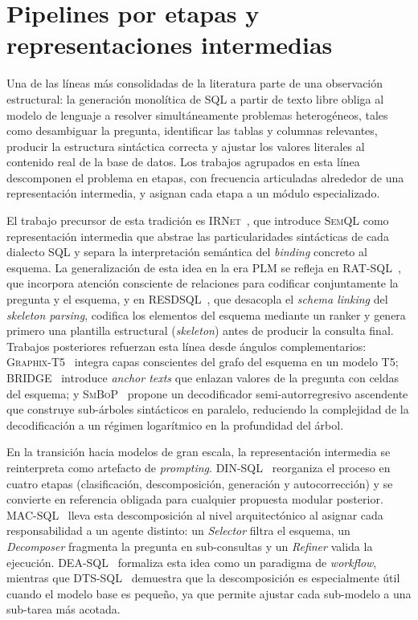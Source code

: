 \section{Pipelines por etapas y representaciones intermedias}
\label{sec:sota-pipelines}

Una de las líneas más consolidadas de la literatura parte de una observación
estructural: la generación monolítica de \ac{SQL} a partir de texto libre
obliga al modelo de lenguaje a resolver simultáneamente problemas heterogéneos,
tales como desambiguar la pregunta, identificar las tablas y columnas
relevantes, producir la estructura sintáctica correcta y ajustar los valores
literales al contenido real de la base de datos. Los trabajos agrupados en
esta línea descomponen el problema en etapas, con frecuencia articuladas
alrededor de una representación intermedia, y asignan cada etapa a un módulo
especializado.

El trabajo precursor de esta tradición es \textsc{IRNet}~\cite{IRNet}, que
introduce \textsc{SemQL} como representación intermedia que abstrae las
particularidades sintácticas de cada dialecto \ac{SQL} y separa la
interpretación semántica del \emph{binding} concreto al esquema. La
generalización de esta idea en la era \ac{PLM} se refleja en
\textsc{RAT-SQL}~\cite{RAT-SQL2021}, que incorpora atención consciente de
relaciones para codificar conjuntamente la pregunta y el esquema, y en
\textsc{RESDSQL}~\cite{RESDSQL2023}, que desacopla el \emph{schema linking}
del \emph{skeleton parsing}, codifica los elementos del esquema mediante un
ranker y genera primero una plantilla estructural (\emph{skeleton}) antes de
producir la consulta final. Trabajos posteriores refuerzan esta línea desde
ángulos complementarios: \textsc{Graphix-T5}~\cite{Graphix-T52022} integra
capas conscientes del grafo del esquema en un modelo \textsc{T5};
\textsc{BRIDGE}~\cite{BRIDGE2020} introduce \emph{anchor texts} que enlazan
valores de la pregunta con celdas del esquema; y
\textsc{SmBoP}~\cite{SmBoP2021} propone un decodificador semi-autorregresivo
ascendente que construye sub-árboles sintácticos en paralelo, reduciendo la
complejidad de la decodificación a un régimen logarítmico en la profundidad
del árbol.

En la transición hacia modelos de gran escala, la representación intermedia
se reinterpreta como artefacto de \emph{prompting}. \textsc{DIN-SQL}~%
\cite{DIN-SQL2023} reorganiza el proceso en cuatro etapas (clasificación,
descomposición, generación y autocorrección) y se convierte en referencia
obligada para cualquier propuesta modular posterior. \textsc{MAC-SQL}~%
\cite{MAC-SQL2023} lleva esta descomposición al nivel arquitectónico al
asignar cada responsabilidad a un agente distinto: un \emph{Selector} filtra
el esquema, un \emph{Decomposer} fragmenta la pregunta en sub-consultas y un
\emph{Refiner} valida la ejecución. \textsc{DEA-SQL}~\cite{DEA-SQL2024}
formaliza esta idea como un paradigma de \emph{workflow}, mientras que
\textsc{DTS-SQL}~\cite{DTS-SQL2024} demuestra que la descomposición es
especialmente útil cuando el modelo base es pequeño, ya que permite ajustar
cada sub-modelo a una sub-tarea más acotada.

